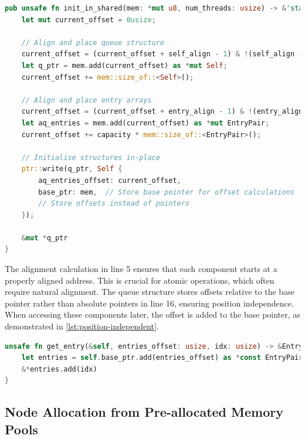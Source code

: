 \begin{lstlisting}[language=Rust, style=boxed, caption={Memory layout initialisation in WCQueue}, label={lst:wcqueue-init}]
pub unsafe fn init_in_shared(mem: *mut u8, num_threads: usize) -> &'static mut Self {
    let mut current_offset = 0usize;
    
    // Align and place queue structure
    current_offset = (current_offset + self_align - 1) & !(self_align - 1);
    let q_ptr = mem.add(current_offset) as *mut Self;
    current_offset += mem::size_of::<Self>();
    
    // Align and place entry arrays
    current_offset = (current_offset + entry_align - 1) & !(entry_align - 1);
    let aq_entries = mem.add(current_offset) as *mut EntryPair;
    current_offset += capacity * mem::size_of::<EntryPair>();
    
    // Initialise structures in-place
    ptr::write(q_ptr, Self {
        aq_entries_offset: current_offset,
        base_ptr: mem,  // Store base pointer for offset calculations
        // Store offsets instead of pointers
    });
    
    &mut *q_ptr
}
\end{lstlisting}

The alignment calculation in line 5 ensures that each component starts at a properly aligned address. This is crucial for atomic operations, which often require natural alignment. The queue structure stores offsets relative to the base pointer rather than absolute pointers in line 16, ensuring position independence. When accessing these components later, the offset is added to the base pointer, as demonstrated in \cref{lst:position-independent}.

\begin{lstlisting}[language=Rust, style=boxed, caption={Position-independent component access}, label={lst:position-independent}]
unsafe fn get_entry(&self, entries_offset: usize, idx: usize) -> &EntryPair {
    let entries = self.base_ptr.add(entries_offset) as *const EntryPair;
    &*entries.add(idx)
}
\end{lstlisting}

\subsection{Node Allocation from Pre-allocated Memory Pools}

